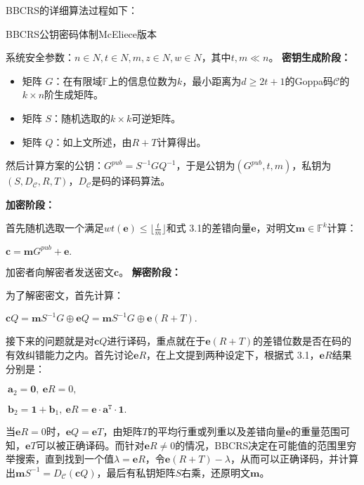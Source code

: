 \begin{flushleft}
	BBCRS的详细算法过程如下：
\end{flushleft}
\begin{breakablealgorithm}
	\small
	\renewcommand{\algorithmicrequire}{\textbf{Input:}}
	\renewcommand{\algorithmicensure}{\textbf{Output:}}
	\caption{BBCRS公钥密码体制McEliece版本}
	\label{alg:BBCRS}
	\begin{algorithmic}	
		\State
		系统安全参数：$n \in N, t \in N, m, z \in N, w \in N$，其中$t,m \ll n$。
		\State
		\textbf{密钥生成阶段：}
		
		\begin{itemize}
			\item 矩阵 $G$：在有限域$\mathbb{F}$上的信息位数为$k$，最小距离为$d \geq 2t + 1$的Goppa码$\mathcal{C}$的$k \times n$阶生成矩阵。
			\item 矩阵 $S$：随机选取的$k \times k$可逆矩阵。
			\item 矩阵 $Q$：如上文所述，由$R + T$计算得出。
		\end{itemize}
		
		然后计算方案的公钥：$G^{pub} = S^{-1}GQ^{-1}$，于是公钥为$(G^{pub}, t, m)$，私钥为$(S,D_\mathcal{C},R,T)$，$D_\mathcal{C}$是码的译码算法。
		
		\State
		\textbf{加密阶段：}
		
		首先随机选取一个满足$wt(\mathbf{e}) \leq \lfloor \frac{t}{m} \rfloor$和式 3.1的差错向量$\mathbf{e}$，对明文$\mathbf{m} \in \mathbb{F}^k$计算：
		
		\begin{center}
			$\mathbf{c} = \mathbf{m}G^{pub} + \mathbf{e}.$
		\end{center}
		
		加密者向解密者发送密文$\mathbf{c}$。
		\State
		\textbf{解密阶段：}
		
		为了解密密文，首先计算：
		\begin{center}
			$\mathbf{c}Q = \mathbf{m}S^{-1}G \oplus\mathbf{e}Q = \mathbf{m}S^{-1}G \oplus\mathbf{e}(R + T).$
		\end{center}
		
		接下来的问题就是对$\mathbf{c}Q$进行译码，重点就在于$\mathbf{e}(R + T)$的差错位数是否在码的有效纠错能力之内。首先讨论$\mathbf{e}R$，在上文提到两种设定下，根据式 3.1，$\mathbf{e}R$结果分别是：
		\begin{center}
			$~\mathbf{a}_2 = \mathbf{0},~\mathbf{e}R = 0,$
			
			$~\mathbf{b}_2=\mathbf{1} + \mathbf{b}_1,~\mathbf{e}R = \mathbf{e} \cdot \mathbf{a}^\mathtt{T} \cdot \mathbf{1}.$
		\end{center}
		当$\mathbf{e}R = 0$时，$\mathbf{e}Q = \mathbf{e}T$，由矩阵$T$的平均行重或列重以及差错向量$\mathbf{e}$的重量范围可知，$\mathbf{e}T$可以被正确译码。而针对$\mathbf{e}R \neq 0$的情况，BBCRS决定在可能值的范围里穷举搜索，直到找到一个值$\lambda = \mathbf{e}R$，令$\mathbf{e}(R + T) - \lambda$，从而可以正确译码，并计算出$\mathbf{m}S^{-1} = D_\mathcal{C}(\mathbf{c}Q)$，最后有私钥矩阵$S$右乘，还原明文$\mathbf{m}$。
	\end{algorithmic}
\end{breakablealgorithm}

